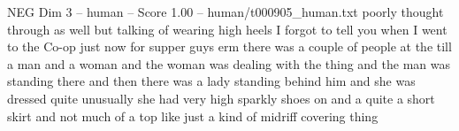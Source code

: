 \begin{textsample}{NEG Dim 3 – human – Score 1.00 – human/t000905\_human.txt}  \label{ex:f3_neg_037}
poorly thought through as well but talking of wearing high heels I forgot to tell you when I went to the Co-op just now for supper guys erm there was a couple of people at the till a man and a woman and the woman was dealing with the thing and the man was standing there and then there was a lady standing behind him and she was dressed quite unusually she had very high sparkly shoes on and a quite a short skirt and not much of a top like just a kind of midriff covering thing

\end{textsample}

